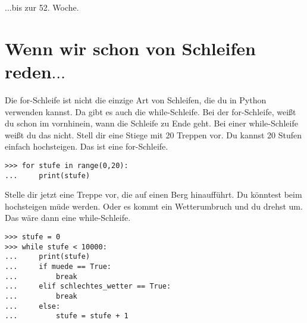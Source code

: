 \texorpdfstring{$\ldots$}{...}bis zur 52. Woche.

\section{Wenn wir schon von Schleifen reden\texorpdfstring{\texorpdfstring{$\ldots$}{...}}{...}}

Die for-Schleife ist nicht die einzige Art von Schleifen, die du in Python verwenden kannst. Da gibt es auch die while-Schleife. Bei der for-Schleife, weißt du schon im vornhinein, wann die Schleife zu Ende geht. Bei einer while-Schleife weißt du das nicht. Stell dir eine Stiege mit 20 Treppen vor. Du kannst 20 Stufen einfach hochsteigen. Das ist eine for-Schleife.

\begin{Verbatim}[frame=single]
>>> for stufe in range(0,20):
...     print(stufe)
\end{Verbatim}

Stelle dir jetzt eine Treppe vor, die auf einen Berg hinaufführt. Du könntest beim hochsteigen müde werden. Oder es kommt ein Wetterumbruch und du drehst um. Das wäre dann eine while-Schleife.

\begin{Verbatim}[frame=single]
>>> stufe = 0
>>> while stufe < 10000:
...     print(stufe)
...     if muede == True:
...         break
...     elif schlechtes_wetter == True:
...         break
...     else:
...         stufe = stufe + 1
\end{Verbatim}

